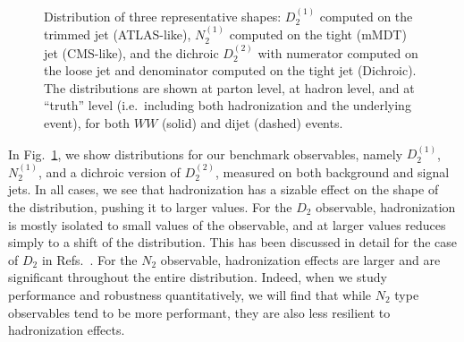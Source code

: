 \documentclass[11pt]{cernrep}
\begin{document}
\begin{figure}
  \caption{Distribution of three representative shapes: $D_2^{(1)}$
    computed on the trimmed jet (ATLAS-like), $N_2^{(1)}$ computed on
    the tight (mMDT) jet (CMS-like), and the dichroic $D_2^{(2)}$ with numerator
    computed on the loose jet and denominator computed on the tight
    jet (Dichroic). The distributions are shown at parton level, at hadron level,
    and at ``truth'' level (i.e.\ including both hadronization and the
    underlying event), for both $WW$ (solid) and dijet (dashed)
    events.}\label{jetsub_2prong_fig:shape-distribution}
\end{figure}

In Fig.~\ref{jetsub_2prong_fig:shape-distribution}, we show
distributions for our benchmark observables, namely $D_2^{(1)}$, $N_2^{(1)}$, and a dichroic version of $D_2^{(2)}$, measured on both background and signal jets.
%
In all cases, we see that hadronization has a sizable effect on the shape of the distribution, pushing it to larger values.
%
For the $D_2$ observable, hadronization is mostly isolated to small values of the observable, and at larger values reduces simply to a shift of the distribution.
%
This has been discussed in detail for the case of $D_2$ in Refs.~\cite{Larkoski:2015kga,Larkoski:2017cqq,Larkoski:2017iuy}.
%
For the $N_2$ observable, hadronization effects are larger and are significant throughout the entire distribution.
%
Indeed, when we study performance and robustness quantitatively, we will find that while $N_2$ type observables tend to be more performant, they are also less resilient to hadronization effects. 
\end{document}
